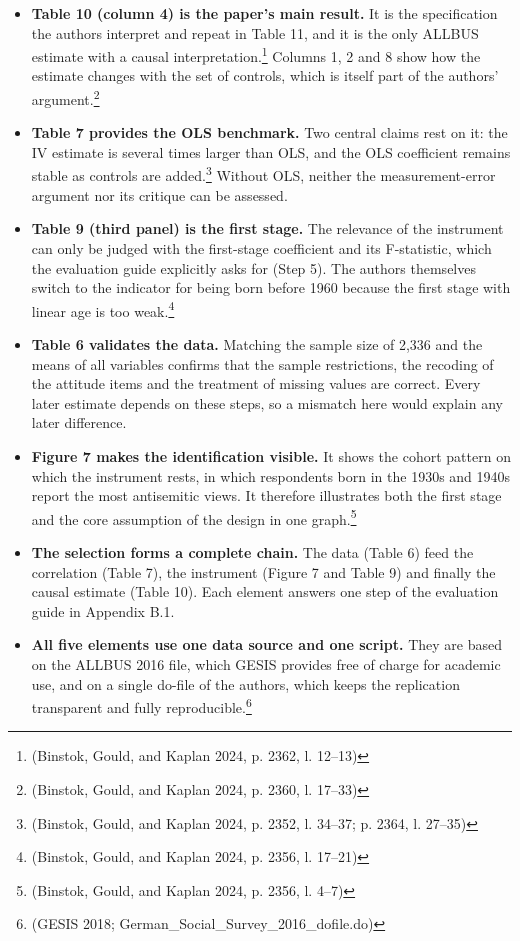 \begin{itemize}
\item
  \textbf{Table 10 (column 4) is the paper's main result.} It is the specification the authors interpret and repeat in Table 11, and it is the only ALLBUS estimate with a causal interpretation.\footnote{(Binstok, Gould, and Kaplan 2024, p. 2362, l. 12--13)} Columns 1, 2 and 8 show how the estimate changes with the set of controls, which is itself part of the authors' argument.\footnote{(Binstok, Gould, and Kaplan 2024, p. 2360, l. 17--33)}
\item
  \textbf{Table 7 provides the OLS benchmark.} Two central claims rest on it: the IV estimate is several times larger than OLS, and the OLS coefficient remains stable as controls are added.\footnote{(Binstok, Gould, and Kaplan 2024, p. 2352, l. 34--37; p. 2364, l. 27--35)} Without OLS, neither the measurement-error argument nor its critique can be assessed.
\item
  \textbf{Table 9 (third panel) is the first stage.} The relevance of the instrument can only be judged with the first-stage coefficient and its F-statistic, which the evaluation guide explicitly asks for (Step 5). The authors themselves switch to the indicator for being born before 1960 because the first stage with linear age is too weak.\footnote{(Binstok, Gould, and Kaplan 2024, p. 2356, l. 17--21)}
\item
  \textbf{Table 6 validates the data.} Matching the sample size of 2,336 and the means of all variables confirms that the sample restrictions, the recoding of the attitude items and the treatment of missing values are correct. Every later estimate depends on these steps, so a mismatch here would explain any later difference.
\item
  \textbf{Figure 7 makes the identification visible.} It shows the cohort pattern on which the instrument rests, in which respondents born in the 1930s and 1940s report the most antisemitic views. It therefore illustrates both the first stage and the core assumption of the design in one graph.\footnote{(Binstok, Gould, and Kaplan 2024, p. 2356, l. 4--7)}
\item
  \textbf{The selection forms a complete chain.} The data (Table 6) feed the correlation (Table 7), the instrument (Figure 7 and Table 9) and finally the causal estimate (Table 10). Each element answers one step of the evaluation guide in Appendix B.1.
\item
  \textbf{All five elements use one data source and one script.} They are based on the ALLBUS 2016 file, which GESIS provides free of charge for academic use, and on a single do-file of the authors, which keeps the replication transparent and fully reproducible.\footnote{(GESIS 2018; German\_Social\_Survey\_2016\_dofile.do)}
\end{itemize}

